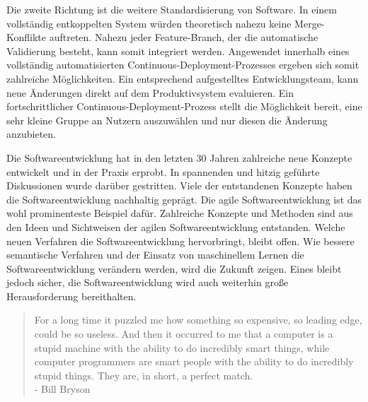 Die zweite Richtung ist die weitere Standardisierung von Software. In einem vollständig entkoppelten System würden theoretisch nahezu keine Merge-Konflikte auftreten. Nahezu jeder Feature-Branch, der die automatische Validierung besteht, kann somit integriert werden. Angewendet innerhalb eines vollständig automatisierten Continuous-Deployment-Prozesses ergeben sich somit zahlreiche Möglichkeiten. Ein entsprechend aufgestelltes Entwicklungsteam, kann neue Änderungen direkt auf dem Produktivsystem evaluieren. Ein fortschrittlicher Continuous-Deployment-Prozess stellt die Möglichkeit bereit, eine sehr kleine Gruppe an Nutzern auszuwählen und nur diesen die Änderung anzubieten.

Die Softwareentwicklung hat in den letzten 30 Jahren zahlreiche neue Konzepte entwickelt und in der Praxis erprobt. In spannenden und hitzig geführte Diskussionen wurde darüber gestritten. Viele der entstandenen Konzepte haben die Softwareentwicklung nachhaltig geprägt. Die agile Softwareentwicklung ist das wohl prominenteste Beispiel dafür. Zahlreiche Konzepte und Methoden sind aus den Ideen und Sichtweisen der agilen Softwareentwicklung entstanden. Welche neuen Verfahren die Softwareentwicklung hervorbringt, bleibt offen. Wie bessere semantische Verfahren und der Einsatz von maschinellem Lernen die Softwareentwicklung verändern werden, wird die Zukunft zeigen. Eines bleibt jedoch sicher, die Softwareentwicklung wird auch weiterhin große Herausforderung bereithalten.

\blockquote {For a long time it puzzled me how something so expensive, so leading edge, could be so useless. And then it occurred to me that a computer is a stupid machine with the ability to do incredibly smart things, while computer programmers are smart people with the ability to do incredibly stupid things. They are, in short, a perfect match. \\- Bill Bryson}
